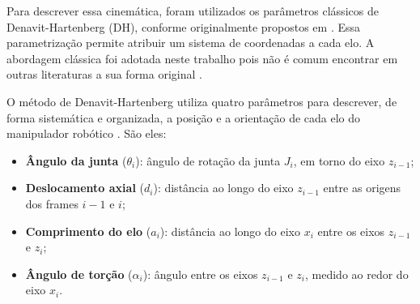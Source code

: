 Para descrever essa cinemática, foram utilizados os parâmetros clássicos de Denavit-Hartenberg (DH), conforme originalmente propostos em \cite{denavitHartenberg1955}. Essa parametrização permite atribuir um sistema de coordenadas a cada elo. A abordagem clássica foi adotada neste trabalho pois não é comum encontrar em outras literaturas a sua forma original \cite{klug2018DH}.

O método de Denavit-Hartenberg utiliza quatro parâmetros para descrever, de forma sistemática e organizada, a posição e a orientação de cada elo do manipulador robótico \cite{denavitHartenberg1955, kucuk2006robot}. São eles:

\begin{itemize}
    \item \textbf{Ângulo da junta} ($\theta_i$): ângulo de rotação da junta $J_i$, em torno do eixo $z_{i-1}$;
    \item \textbf{Deslocamento axial} ($d_i$): distância ao longo do eixo $z_{i-1}$ entre as origens dos frames $i-1$ e $i$;
    \item \textbf{Comprimento do elo} ($a_i$): distância ao longo do eixo $x_i$ entre os eixos $z_{i-1}$ e $z_i$;
    \item \textbf{Ângulo de torção} ($\alpha_i$): ângulo entre os eixos $z_{i-1}$ e $z_i$, medido ao redor do eixo $x_i$.
\end{itemize}